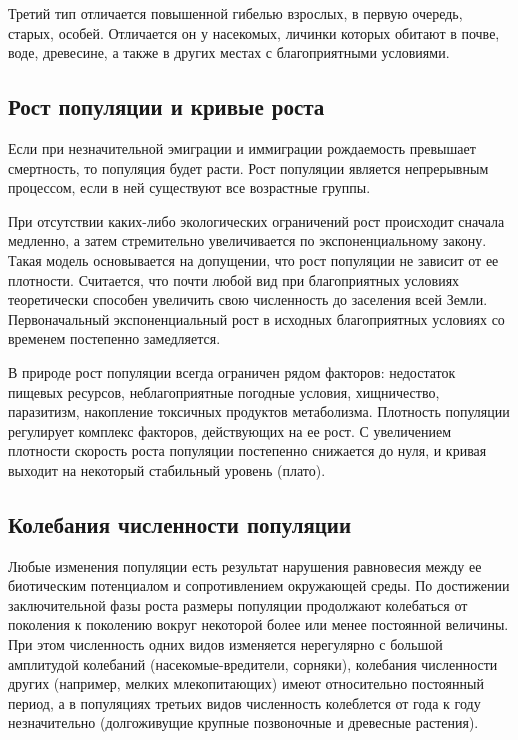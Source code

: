 \documentclass[a5paper, 11pt]{extarticle}
\theoremstyle{definition}
\theoremstyle{definition}
\theoremstyle{definition}
\numberwithin{figure}{section}
\begin{document}
Третий тип отличается повышенной гибелью взрослых, в первую очередь, старых, особей. Отличается он у насекомых, личинки которых обитают в почве, воде, древесине, а также в других местах с благоприятными условиями.

\subsection{Рост популяции и кривые роста}

Если при незначительной эмиграции и иммиграции рождаемость превышает смертность, то популяция будет расти. Рост популяции является непрерывным процессом, если в ней существуют все возрастные группы.

При отсутствии каких-либо экологических ограничений рост происходит сначала медленно, а затем стремительно увеличивается по экспоненциальному закону. Такая модель основывается на допущении, что рост популяции не зависит от ее плотности. Считается, что почти любой вид при благоприятных условиях теоретически способен увеличить свою численность до заселения всей Земли. Первоначальный экспоненциальный рост в исходных благоприятных условиях со временем постепенно замедляется.

В природе рост популяции всегда ограничен рядом факторов: недостаток пищевых ресурсов, неблагоприятные погодные условия, хищничество, паразитизм, накопление токсичных продуктов метаболизма. Плотность популяции регулирует комплекс факторов, действующих на ее рост. С увеличением плотности скорость роста популяции постепенно снижается до нуля, и кривая выходит на некоторый стабильный уровень (плато).

\subsection{Колебания численности популяции}

Любые изменения популяции есть результат нарушения равновесия между ее биотическим потенциалом и сопротивлением окружающей среды. По достижении заключительной фазы роста размеры популяции продолжают колебаться от поколения к поколению вокруг некоторой более или менее постоянной величины. При этом численность одних видов изменяется нерегулярно с большой амплитудой колебаний (насекомые-вредители, сорняки), колебания численности других (например, мелких млекопитающих) имеют относительно постоянный период, а в популяциях третьих видов численность колеблется от года к году незначительно (долгоживущие крупные позвоночные и древесные растения).
\end{document}
